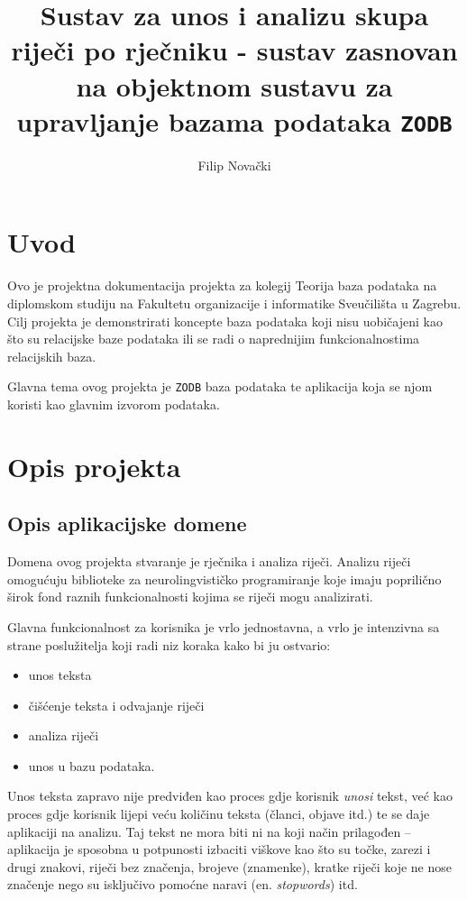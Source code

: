 \documentclass{foi}
\title{Sustav za unos i analizu skupa riječi po rječniku - sustav zasnovan na
objektnom sustavu za upravljanje bazama podataka \texttt{ZODB}}
\author{Filip Novački}
\begin{document}
\maketitle
\tableofcontents

\chapter{Uvod}

Ovo je projektna dokumentacija projekta za kolegij Teorija baza podataka na
diplomskom studiju na Fakultetu organizacije i informatike Sveučilišta u
Zagrebu. Cilj projekta je demonstrirati koncepte baza podataka koji nisu
uobičajeni kao što su relacijske baze podataka ili se radi o naprednijim
funkcionalnostima relacijskih baza.

Glavna tema ovog projekta je \texttt{ZODB} baza podataka te aplikacija koja se
njom koristi kao glavnim izvorom podataka.

\chapter{Opis projekta}

\section{Opis aplikacijske domene}

Domena ovog projekta stvaranje je rječnika i analiza riječi. Analizu riječi
omogućuju biblioteke za neurolingvističko programiranje koje imaju poprilično
širok fond raznih funkcionalnosti kojima se riječi mogu analizirati.

Glavna funkcionalnost za korisnika je vrlo jednostavna, a vrlo je intenzivna sa
strane poslužitelja koji radi niz koraka kako bi ju ostvario:
\begin{itemize}
	\item unos teksta
	\item čišćenje teksta i odvajanje riječi
	\item analiza riječi
	\item unos u bazu podataka.
\end{itemize}

Unos teksta zapravo nije predviđen kao proces gdje korisnik \textit{unosi}
tekst, već kao proces gdje korisnik lijepi veću količinu teksta (članci, objave
itd.) te se daje aplikaciji na analizu. Taj tekst ne mora biti ni na koji način
prilagođen -- aplikacija je sposobna u potpunosti izbaciti viškove kao što su
točke, zarezi i drugi znakovi, riječi bez značenja, brojeve (znamenke), kratke
riječi koje ne nose značenje nego su isključivo pomoćne naravi (en.
\textit{stopwords}) itd.
\end{document}
